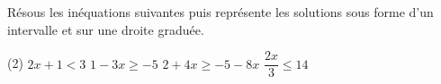 %
%
    Résous les inéquations suivantes puis représente les solutions sous forme d'un intervalle et sur une droite graduée.
    \begin{tasks}(2)
        \task \(2x+1<3\)
        \task \(1-3x \ge -5\)
        \task \(2 + 4x \ge -5 - 8x\)
        \task \(\dfrac{2x}{3} \le 14\)
    \end{tasks}
